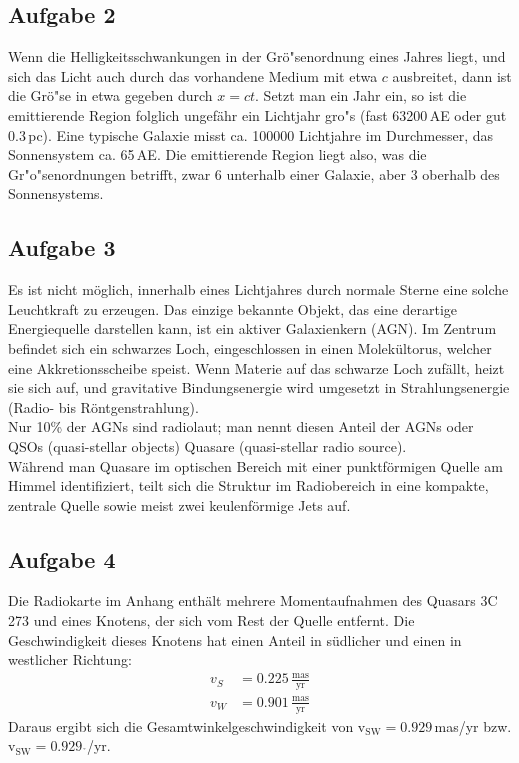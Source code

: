 \documentclass[12pt]{article}
\begin{document}
\subsection{Aufgabe 2}

Wenn die Helligkeitsschwankungen in der Gr\"{o}"senordnung eines Jahres liegt, und sich das Licht auch durch das vorhandene Medium mit etwa $c$ ausbreitet, dann ist die Gr\"{o}"se in etwa gegeben durch $x = ct$. Setzt man ein Jahr ein, so ist die emittierende Region folglich ungef\"{a}hr ein Lichtjahr gro"s (fast 63200\,AE oder gut 0.3\,pc). Eine typische Galaxie misst ca. 100000 Lichtjahre im Durchmesser, das Sonnensystem ca. 65\,AE. Die emittierende Region liegt also, was die Gr"{o}"senordnungen betrifft, zwar 6 unterhalb einer Galaxie, aber 3 oberhalb des Sonnensystems.

\subsection{Aufgabe 3}

Es ist nicht m\"{o}glich, innerhalb eines Lichtjahres durch normale Sterne eine solche Leuchtkraft zu erzeugen. Das einzige bekannte Objekt, das eine derartige Energiequelle darstellen kann, ist ein aktiver Galaxienkern (AGN). Im Zentrum befindet sich ein schwarzes Loch, eingeschlossen in einen Molek\"{u}ltorus, welcher eine Akkretionsscheibe speist. Wenn Materie auf das schwarze Loch zuf\"{a}llt, heizt sie sich auf, und gravitative Bindungsenergie wird umgesetzt in Strahlungsenergie (Radio- bis R\"{o}ntgenstrahlung). \\
Nur 10\% der AGNs sind radiolaut; man nennt diesen Anteil der AGNs oder QSOs (quasi-stellar objects) Quasare (quasi-stellar radio source).  \\
W\"{a}hrend man Quasare im optischen Bereich mit einer punktf\"{o}rmigen Quelle am Himmel identifiziert, teilt sich die Struktur im Radiobereich in eine kompakte, zentrale Quelle sowie meist zwei keulenf\"{o}rmige Jets auf. 

\subsection{Aufgabe 4}

Die Radiokarte im Anhang enth\"{a}lt mehrere Momentaufnahmen des Quasars 3C 273 und eines Knotens, der sich vom Rest der Quelle entfernt. Die Geschwindigkeit dieses Knotens hat einen Anteil in s\"{u}dlicher und einen in westlicher Richtung:
\begin{align*}
	v_S&=0.225\,\frac{\text{mas}}{\text{yr}}\\
	v_W&=0.901\,\frac{\text{mas}}{\text{yr}}
\end{align*}
Daraus ergibt sich die Gesamtwinkelgeschwindigkeit von v$_\text{SW}=0.929\,$mas/yr bzw. v$_\text{SW}=0.929$\,\,$\mathring{}$/yr. 
\end{document}
